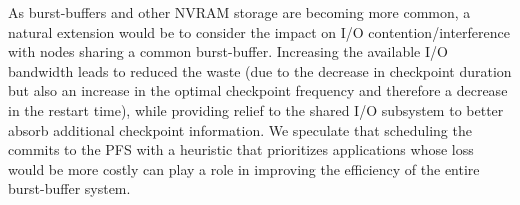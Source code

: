 As burst-buffers and other NVRAM storage are becoming more common, a natural
extension would be to consider the impact on I/O contention/interference with
nodes sharing a common burst-buffer. Increasing the available I/O bandwidth
leads to reduced the waste (due to the decrease in checkpoint duration but also
an increase in the optimal checkpoint frequency and therefore a decrease in the
restart time), while providing relief to the shared I/O subsystem to better
absorb additional checkpoint information. We speculate that scheduling the
commits to the PFS with a heuristic that prioritizes applications whose loss
would be more costly can play a role in improving the efficiency of the entire
burst-buffer system.

